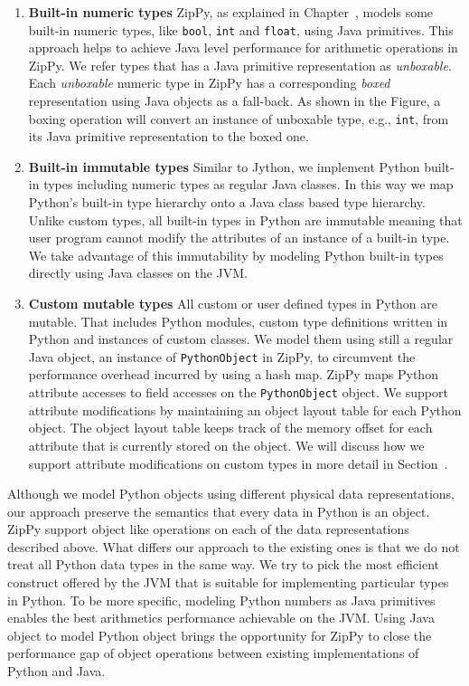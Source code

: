 \begin{enumerate}

\item \textbf{Built-in numeric types}
ZipPy, as explained in Chapter~, models some built-in numeric types, like \texttt{bool}, \texttt{int} and \texttt{float}, using Java primitives.
This approach helps to achieve Java level performance for arithmetic operations in ZipPy.
We refer types that has a Java primitive representation as \emph{unboxable}.
Each \emph{unboxable} numeric type in ZipPy has a corresponding \emph{boxed} representation using Java objects as a fall-back.
As shown in the Figure, a boxing operation will convert an instance of unboxable type, e.g., \texttt{int}, from its Java primitive representation to the boxed one.

\item \textbf{Built-in immutable types}
Similar to Jython, we implement Python built-in types including numeric types as regular Java classes.
In this way we map Python's built-in type hierarchy onto a Java class based type hierarchy.
Unlike custom types, all built-in types in Python are immutable meaning that user program cannot modify the attributes of an instance of a built-in type.
We take advantage of this immutability by modeling Python built-in types directly using Java classes on the JVM.

\item \textbf{Custom mutable types}
All custom or user defined types in Python are mutable.
That includes Python modules, custom type definitions written in Python and instances of custom classes.
We model them using still a regular Java object, an instance of \texttt{PythonObject} in ZipPy, to circumvent the performance overhead incurred by using a hash map.
ZipPy maps Python attribute accesses to field accesses on the \texttt{PythonObject} object.
We support attribute modifications by maintaining an object layout table for each Python object.
The object layout table keeps track of the memory offset for each attribute that is currently stored on the object.
We will discuss how we support attribute modifications on custom types in more detail in Section~.

\end{enumerate}

Although we model Python objects using different physical data representations, our approach preserve the semantics that every data in Python is an object.
ZipPy support object like operations on each of the data representations described above.
What differs our approach to the existing ones is that we do not treat all Python data types in the same way.
We try to pick the most efficient construct offered by the JVM that is suitable for implementing particular types in Python.
To be more specific, modeling Python numbers as Java primitives enables the best arithmetics performance achievable on the JVM.
Using Java object to model Python object brings the opportunity for ZipPy to close the performance gap of object operations between existing implementations of Python and Java.


